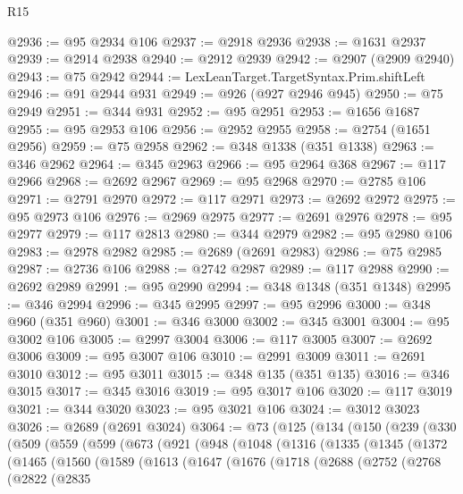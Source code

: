 \begin{lexlean}{R15}
\begin{coremodule}
@2936 := @95 @2934 @106
@2937 := @2918 @2936
@2938 := @1631 @2937
@2939 := @2914 @2938
@2940 := @2912 @2939
@2942 := @2907 (@2909 @2940)
@2943 := @75 @2942
@2944 := LexLeanTarget.TargetSyntax.Prim.shiftLeft
@2946 := @91 @2944 @931
@2949 := @926 (@927 @2946 @945)
@2950 := @75 @2949
@2951 := @344 @931
@2952 := @95 @2951
@2953 := @1656 @1687
@2955 := @95 @2953 @106
@2956 := @2952 @2955
@2958 := @2754 (@1651 @2956)
@2959 := @75 @2958
@2962 := @348 @1338 (@351 @1338)
@2963 := @346 @2962
@2964 := @345 @2963
@2966 := @95 @2964 @368
@2967 := @117 @2966
@2968 := @2692 @2967
@2969 := @95 @2968
@2970 := @2785 @106
@2971 := @2791 @2970
@2972 := @117 @2971
@2973 := @2692 @2972
@2975 := @95 @2973 @106
@2976 := @2969 @2975
@2977 := @2691 @2976
@2978 := @95 @2977
@2979 := @117 @2813
@2980 := @344 @2979
@2982 := @95 @2980 @106
@2983 := @2978 @2982
@2985 := @2689 (@2691 @2983)
@2986 := @75 @2985
@2987 := @2736 @106
@2988 := @2742 @2987
@2989 := @117 @2988
@2990 := @2692 @2989
@2991 := @95 @2990
@2994 := @348 @1348 (@351 @1348)
@2995 := @346 @2994
@2996 := @345 @2995
@2997 := @95 @2996
@3000 := @348 @960 (@351 @960)
@3001 := @346 @3000
@3002 := @345 @3001
@3004 := @95 @3002 @106
@3005 := @2997 @3004
@3006 := @117 @3005
@3007 := @2692 @3006
@3009 := @95 @3007 @106
@3010 := @2991 @3009
@3011 := @2691 @3010
@3012 := @95 @3011
@3015 := @348 @135 (@351 @135)
@3016 := @346 @3015
@3017 := @345 @3016
@3019 := @95 @3017 @106
@3020 := @117 @3019
@3021 := @344 @3020
@3023 := @95 @3021 @106
@3024 := @3012 @3023
@3026 := @2689 (@2691 @3024)
@3064 := @73
    (@125
      (@134
        (@150
          (@239
            (@330
              (@509
                (@559
                  (@599
                    (@673
                      (@921
                        (@948
                          (@1048
                            (@1316
                              (@1335
                                (@1345
                                  (@1372
                                    (@1465
                                      (@1560
                                        (@1589
                                          (@1613
                                            (@1647
                                              (@1676
                                                (@1718
                                                  (@2688
                                                    (@2752
                                                      (@2768
                                                        (@2822
                                                          (@2835

\end{coremodule}
\end{lexlean}
